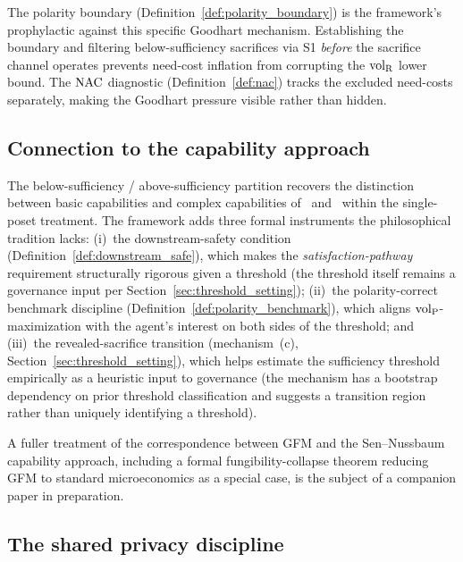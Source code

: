 The polarity boundary (Definition~\ref{def:polarity_boundary})
is the framework's prophylactic against this specific Goodhart
mechanism.  Establishing the boundary and filtering
below-sufficiency sacrifices via S1 \emph{before} the sacrifice
channel operates prevents need-cost inflation from corrupting
the ${\operatorname{vol}_{\mathrm{R}}}$ lower bound.  The $\mathrm{NAC}$ diagnostic
(Definition~\ref{def:nac}) tracks the excluded need-costs
separately, making the Goodhart pressure visible rather than
hidden.

\subsection{Connection to the capability approach}

The below-sufficiency / above-sufficiency partition recovers
the distinction between basic capabilities and complex
capabilities of~\citet{sen1999development}
and~\citet{nussbaum2011creating} within the single-poset
treatment.  The framework adds three formal instruments the
philosophical tradition lacks: (i)~the downstream-safety
condition
(Definition~\ref{def:downstream_safe}), which makes the
\emph{satisfaction-pathway} requirement structurally rigorous
given a threshold (the threshold itself remains a governance
input per Section~\ref{sec:threshold_setting});
(ii)~the polarity-correct benchmark discipline
(Definition~\ref{def:polarity_benchmark}), which aligns
${\operatorname{vol}_{\mathrm{P}}}$-maximization with the agent's interest on both sides of
the threshold; and (iii)~the revealed-sacrifice transition
(mechanism~(c), Section~\ref{sec:threshold_setting}), which
helps estimate the sufficiency threshold empirically as a
heuristic input to governance (the mechanism has a bootstrap
dependency on prior threshold classification and suggests a
transition region rather than uniquely identifying a
threshold).

A fuller treatment of the correspondence between GFM and the
Sen--Nussbaum capability approach, including a formal
fungibility-collapse theorem reducing GFM to standard
microeconomics as a special case, is the subject of a companion
paper in preparation.

\subsection{The shared privacy discipline}

